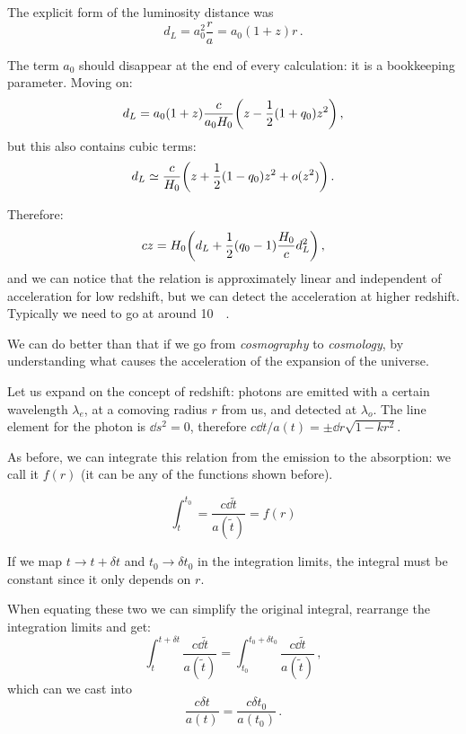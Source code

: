 \documentclass[main.tex]{subfiles}
\begin{document}
The explicit form of the luminosity distance was
\begin{equation}
  d_L = a_0^2 \frac{r}{a} = a_0 (1+z) r\,.
\end{equation}

The term \(a_0 \) should disappear at the end of every calculation: it is a bookkeeping parameter.
Moving on:
\begin{equation}
  d_L = a_0 (1+z) \frac{c}{a_0 H_0 } \qty(z - \frac{1}{2} (1+ q_0 )z^2)\,,
\end{equation}
%
but this also contains cubic terms:
\begin{equation}
  d_L \simeq \frac{c}{H_0} \qty(z + \frac{1}{2} (1-q_0 ) z^2 + o(z^2))\,.
\end{equation}

Therefore:
\begin{equation}
  cz = H_0 \qty(d_L + \frac{1}{2} (q_0 -1 ) \frac{H_0}{c} d_L^2)\,,
\end{equation}
%
and we can notice that the relation is approximately linear and independent of acceleration for low redshift, but we can detect the acceleration at higher redshift.
Typically we need to go at around \SI{10}{\mega\parsec}.


We can do better than that if we go from \emph{cosmography} to \emph{cosmology}, by understanding what causes the acceleration of the expansion of the universe.

Let us expand on the concept of redshift:
photons are emitted with a certain wavelength \(\lambda_{e}\), at a comoving radius \(r\) from us, and detected at \(\lambda_{o}\).
The line element for the photon is \(\dd{s^2} =0\), therefore \(c\dd{t}/ a(t) = \pm \dd{r} \sqrt{1-kr^2} \).

As before, we can integrate this relation from the emission to the absorption: we call it \(f(r)\) (it can be any of the functions shown before).

\begin{equation}
  \int_{t}^{t_0 } = \frac{c\dd{\widetilde{t}}}{a(\widetilde{t})} = f(r)
\end{equation}

If we map \(t \rightarrow t + \delta t\) and \(t_0 \rightarrow \delta t_0 \) in the integration limits, the integral must be constant since it only depends on \(r\).

When equating these two we can simplify the original integral, rearrange the integration limits and get:
\begin{equation}
  \int_{t}^{t + \delta t} \frac{c\dd{\widetilde{t}}}{a(\widetilde{t})} = \int_{t_0 }^{t_0 + \delta t_0 } \frac{c\dd{\widetilde{t}}}{a(\widetilde{t})}\,,
\end{equation}
%
which can we cast into
\begin{equation}
  \frac{c \delta t}{a(t)} =   \frac{c \delta t_0 }{a(t_0 )}\,.
\end{equation}
\end{document}
